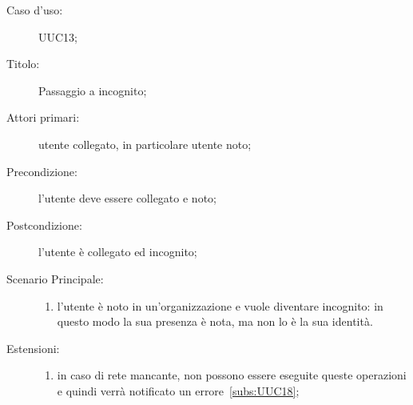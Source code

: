 \documentclass[../../../analisi-dei-requisiti.tex]{subfiles}
\begin{document}
\begin{description}
  \item[Caso d'uso:] UUC13;
  \item[Titolo:] Passaggio a incognito;
  \item[Attori primari:] utente collegato, in particolare utente noto;
  \item[Precondizione:] l'utente deve essere collegato e noto;
  \item[Postcondizione:] l'utente è collegato ed incognito;
  \item[Scenario Principale:]
        \begin{enumerate}
          \item l'utente è noto in un'organizzazione e vuole diventare incognito: in questo modo la sua presenza è nota, ma non lo è la sua identità.
        \end{enumerate}
  \item[Estensioni:]
        \begin{enumerate}
          \item in caso di rete mancante, non possono essere eseguite queste operazioni e quindi verrà notificato un errore~\ref{subs:UUC18};
        \end{enumerate}
\end{description}
\end{document}
